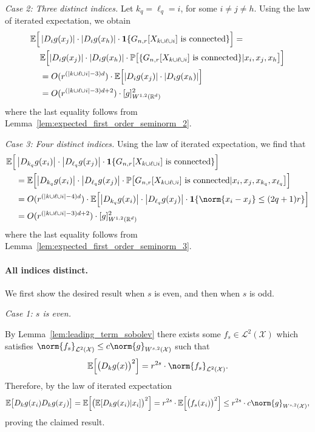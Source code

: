 \documentclass{article}
\newcommand{\Reals}{\mathbb{R}}
\newcommand{\abs}[1]{\left \lvert #1 \right \rvert}
\newcommand{\1}{\mathbf{1}}
\newcommand{\Rd}{\Reals^d}
\newcommand{\Xset}{\mathcal{X}}
\newcommand{\Leb}{\mathcal{L}}
\newcommand{\Pbb}{\mathbb{P}}
\newcommand{\Ebb}{\mathbb{E}}
\theoremstyle{alden}
\theoremstyle{aldenthm}
\theoremstyle{definition}
\theoremstyle{remark}
\begin{document}
\textit{Case 2: Three distinct indices.}
Let $k_q = \ell_q = i$, for some $i \neq j \neq h$. Using the law of iterated expectation, we obtain
\begin{align*}
\Ebb \Bigl[ & \abs{D_{i}g(x_j)} \cdot \abs{D_ig(x_h)} \cdot \1\{G_{n,r}[X_{k \cup \ell \cup i}] ~\textrm{is connected} \}\Bigr] = \nonumber \\
& \Ebb\Bigl[\abs{D_{i}g(x_j)} \cdot \abs{D_ig(x_h)} \cdot \Pbb\bigl[\{G_{n,r}[X_{k \cup \ell \cup i}] ~\textrm{is connected} \} |x_i,x_j,x_h\bigr]\Bigr] \nonumber \\
& = O(r^{(\abs{k \cup \ell \cup i} - 3)d}) \cdot \Ebb\Bigl[\abs{D_{i}g(x_j)} \cdot \abs{D_ig(x_h)} \Bigr] \nonumber \\
& = O(r^{(\abs{k \cup \ell \cup i} - 3)d + 2})\cdot[g]_{W^{1,2}(\Rd)}^2
\end{align*}
where the last equality follows from Lemma~\ref{lem:expected_first_order_seminorm_2}.


\textit{Case 3: Four distinct indices.}
Using the law of iterated expectation, we find that
\begin{align*}
\Ebb\Bigl[ &\abs{D_{k_q}g(x_i)}\cdot{\abs{D_{\ell_q}g(x_j)}} \cdot \1\{G_{n,r}[X_{k \cup \ell \cup i}] ~\textrm{is connected} \}\Bigr] \\
& = \Ebb\Bigl[\abs{D_{k_q}g(x_i)}\cdot{\abs{D_{\ell_q}g(x_j)}} \cdot\Pbb\bigl[G_{n,r}[X_{k \cup \ell \cup i}] ~\textrm{is connected}|x_i,x_j,x_{k_q},x_{\ell_q}\bigr]\Bigr] \\
& = O(r^{(\abs{k \cup \ell \cup i} - 4)d}) \cdot \Ebb\Bigl[\abs{D_{k_q}g(x_i)}\cdot{\abs{D_{\ell_q}g(x_j)}}\cdot\1\{\norm{x_i - x_j} \leq (2q + 1)r\}\Bigr] \\
& = O(r^{(\abs{k \cup \ell \cup i} - 3)d + 2}) \cdot [g]_{W^{1,2}(\Rd)}^2
\end{align*}
where the last equality follows from Lemma~\ref{lem:expected_first_order_seminorm_3}.

\paragraph{All indices distinct.}

We first show the desired result when $s$ is even, and then when $s$ is odd. 

\textit{Case 1: $s$ is even.}

By Lemma~\ref{lem:leading_term_sobolev} there exists some $f_s \in \Leb^2(\Xset)$ which satisfies $\norm{f_s}_{\Leb^2(\Xset)} \leq c \norm{g}_{W^{s,2}(\Xset)}$ such that
\begin{equation*}
\Ebb\Bigl[\bigl(D_kg(x)\bigr)^2\Bigr] = r^{2s} \cdot \norm{f_s}_{\Leb^2(\Xset)}.
\end{equation*} Therefore, by the law of iterated expectation 
\begin{align*}
\Ebb\bigl[D_kg(x_i)D_kg(x_j)\bigr] = \Ebb\Bigl[\bigl(\Ebb[D_kg(x_i)|x_i]\bigr)^2\Bigr] = r^{2s} \cdot \Ebb\Bigl[\bigl(f_s(x_i)\bigr)^2\Bigr] \leq r^{2s} \cdot c \norm{g}_{W^{s,2}(\Xset)},
\end{align*}
proving the claimed result.
\end{document}
